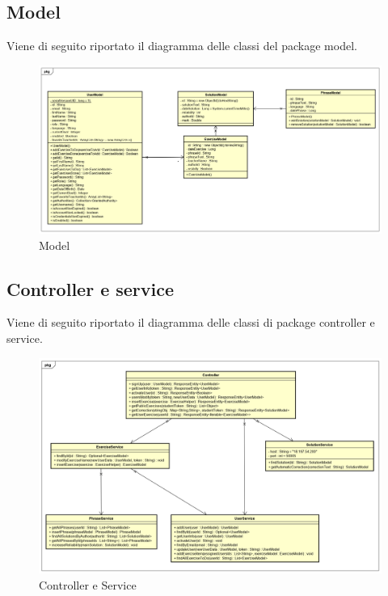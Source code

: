 \subsection{Model}
Viene di seguito riportato il diagramma delle classi del package model.
\begin{figure}[H]
\centering
\includegraphics[width=17cm, keepaspectratio]{img/model.png} 
\caption{Model}
\end{figure}
\newpage

\subsection{Controller e service}
Viene di seguito riportato il diagramma delle classi di package controller e service.
\begin{figure}[H]
\centering
\includegraphics[width=17cm, keepaspectratio]{img/Controller-service.png} 
\caption{Controller e Service}
\end{figure}
\newpage
